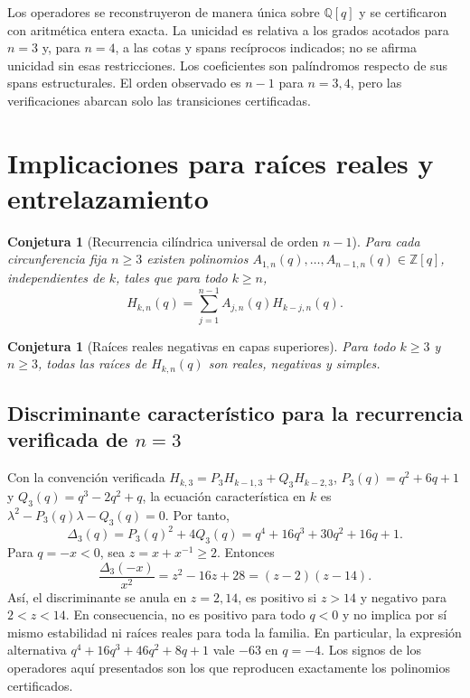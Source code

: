 \documentclass[11pt,a4paper]{article}
\newtheorem{conjecture}[theorem]{Conjetura}
\theoremstyle{definition}
\begin{document}
Los operadores se reconstruyeron de manera única sobre $\mathbb Q[q]$ y se certificaron con aritmética entera exacta. La unicidad es relativa a los grados acotados para $n=3$ y, para $n=4$, a las cotas y spans recíprocos indicados; no se afirma unicidad sin esas restricciones. Los coeficientes son palíndromos respecto de sus spans estructurales. El orden observado es $n-1$ para $n=3,4$, pero las verificaciones abarcan solo las transiciones certificadas.

\section{Implicaciones para raíces reales y entrelazamiento}

\begin{conjecture}[Recurrencia cilíndrica universal de orden $n-1$]
\label{conj:recurrencia}
Para cada circunferencia fija $n\ge3$ existen polinomios
$A_{1,n}(q),\ldots,A_{n-1,n}(q)\in\mathbb Z[q]$, independientes de $k$,
tales que para todo $k\ge n$,
\[
H_{k,n}(q)=\sum_{j=1}^{n-1}A_{j,n}(q)H_{k-j,n}(q).
\]
\end{conjecture}

\begin{conjecture}[Raíces reales negativas en capas superiores]
\label{conj:raices}
Para todo $k\ge3$ y $n\ge3$, todas las raíces de $H_{k,n}(q)$ son reales, negativas y simples.
\end{conjecture}

\subsection{Discriminante característico para la recurrencia verificada de $n=3$}

Con la convención verificada $H_{k,3}=P_3H_{k-1,3}+Q_3H_{k-2,3}$,
$P_3(q)=q^2+6q+1$ y $Q_3(q)=q^3-2q^2+q$, la ecuación característica en $k$ es $\lambda^2-P_3(q)\lambda-Q_3(q)=0$. Por tanto,
\[
\Delta_3(q)=P_3(q)^2+4Q_3(q)
=q^4+16q^3+30q^2+16q+1.
\]
Para $q=-x<0$, sea $z=x+x^{-1}\ge2$. Entonces
\[
\frac{\Delta_3(-x)}{x^2}=z^2-16z+28=(z-2)(z-14).
\]
Así, el discriminante se anula en $z=2,14$, es positivo si $z>14$ y negativo para $2<z<14$. En consecuencia, no es positivo para todo $q<0$ y no implica por sí mismo estabilidad ni raíces reales para toda la familia. En particular, la expresión alternativa $q^4+16q^3+46q^2+8q+1$ vale $-63$ en $q=-4$. Los signos de los operadores aquí presentados son los que reproducen exactamente los polinomios certificados.
\end{document}
